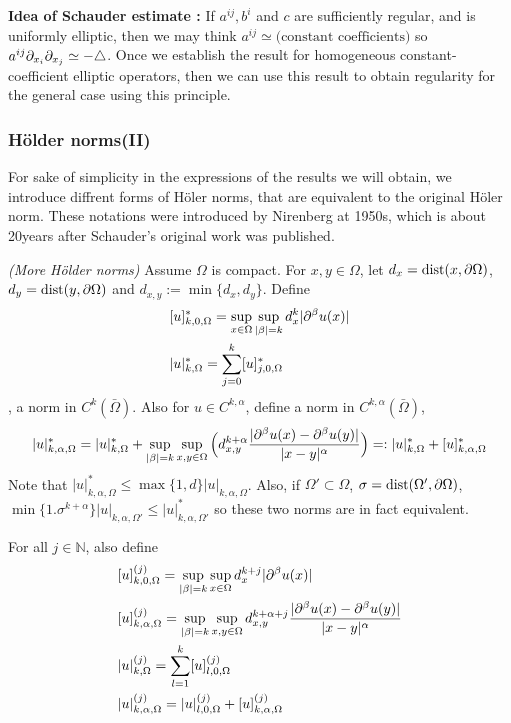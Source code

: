 \documentclass[12pt,a4paper]{article}
\begin{document}
\textbf{Idea of Schauder estimate :} If $a^{ij},b^i$ and $c$ are sufficiently regular, and is uniformly elliptic, then we may think  $a^{ij}\simeq \text{(constant coefficients)}$ so $a^{ij} \partial_{x_i} \partial_{x_j} \simeq -\triangle$. Once we establish the result for homogeneous constant-coefficient elliptic operators, then we can use this result to obtain regularity for the general case using this principle.
\s

\subsubsection*{H\"older norms(II)}

For sake of simplicity in the expressions of the results we will obtain, we introduce diffrent forms of H\"oler norms, that are equivalent to the original H\"oler norm. These notations were introduced by Nirenberg at 1950s, which is about 20years after Schauder's original work was published.
\s

 \emph{(More H\"older norms)} Assume $\Omega$ is compact. For $x,y\in \Omega$, let $d_x = \text{dist}(x, \partial \Omega)$, $d_y = \text{dist}(y, \partial \Omega)$ and $d_{x,y} := \min \{d_x,d_y\}$. Define
\begin{align*}
& [ u ]^*_{k,0, \Omega} = \sup_{x\in \Omega} \sup_{|\beta|=k} d^k_{x} |\partial^{\beta} u(x)|\\
& |u|^*_{k, \Omega}= \sum_{j=0}^k [u]^*_{j,0,\Omega}
\end{align*}
, a norm in $C^k(\bar{\Omega})$. Also for $u\in C^{k, \alpha}$, define a norm in $C^{k, \alpha}(\bar{\Omega})$,
\begin{align*}
|u|^*_{k, \alpha, \Omega} = |u|^*_{k, \Omega} + \sup_{|\beta| =k} \sup_{x,y\in \Omega} \Big( d_{x,y}^{k+\alpha} \frac{|\partial^{\beta} u(x) - \partial^{\beta} u(y)|}{|x-y|^{\alpha}} \Big) =: |u|^*_{k, \Omega} +[u]^*_{k, \alpha, \Omega}
\end{align*}
Note that $|u|^*_{k, \alpha, \Omega} \leq \max\{1, d\} |u|_{k,\alpha, \Omega}$. Also, if $\Omega ' \subset \Omega$, $\sigma = \text{dist}(\Omega', \partial \Omega)$, $\min \{1. \sigma^{k+\alpha}\} |u|_{k, \alpha, \Omega'} \leq |u|^*_{k, \alpha, \Omega'}$ so these two norms are in fact equivalent.
\s

For all $j\in \mathbb{N}$, also define
\begin{align*}
&[u]^{(j)}_{k,0, \Omega} = \sup_{|\beta|=k} \sup_{x\in \Omega} d^{k+j}_{x} |\partial^{\beta} u(x)| \\
&[u]^{(j)}_{k, \alpha,\Omega} = \sup_{|\beta| =k} \sup_{x,y\in \Omega} d^{k+\alpha +j}_{x,y} \frac{|\partial^{\beta} u(x) - \partial^{\beta}u(y)|}{|x-y|^{\alpha}} \\
&|u|^{(j)}_{k,\Omega} =\sum_{l=1}^k [u]^{(j)}_{l, 0, \Omega}\\
& |u|^{(j)}_{k, \alpha, \Omega} = |u|^{(j)}_{l, 0, \Omega} + [u]^{(j)}_{k, \alpha, \Omega}
\end{align*}
\s
\end{document}
